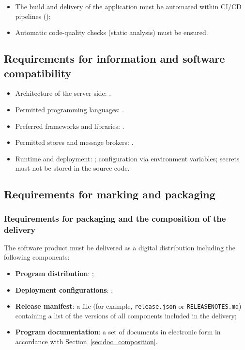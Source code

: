 \documentclass[12pt,a4paper]{extarticle}
\begin{document}
\begin{itemize}[leftmargin=1.25cm]
\item The build and delivery of the application must be automated within CI/CD pipelines ();
\item Automatic code-quality checks (static analysis) must be ensured.
\end{itemize}

\subsection{Requirements for information and software compatibility}

\begin{itemize}[leftmargin=1.25cm]
\item Architecture of the server side: .
\item Permitted programming languages: .
\item Preferred frameworks and libraries: .
\item Permitted stores and message brokers: .
\item Runtime and deployment: ; configuration via environment variables; secrets must not be stored in the source code.
\end{itemize}

\subsection{Requirements for marking and packaging}

\subsubsection{Requirements for packaging and the composition of the delivery}

\begin{hseExample}
The software product must be delivered as a digital distribution including the following components:
\begin{itemize}[nosep, leftmargin=1.25cm]
    \item \textbf{Program distribution}: ;
    \item \textbf{Deployment configurations}: ;
    \item \textbf{Release manifest}: a file (for example, \texttt{release.json} or \texttt{RELEASENOTES.md}) containing a list of the versions of all components included in the delivery;
    \item \textbf{Program documentation}: a set of documents in electronic form in accordance with Section~\ref{sec:doc_composition}.
\end{itemize}
\end{hseExample}
\end{document}
